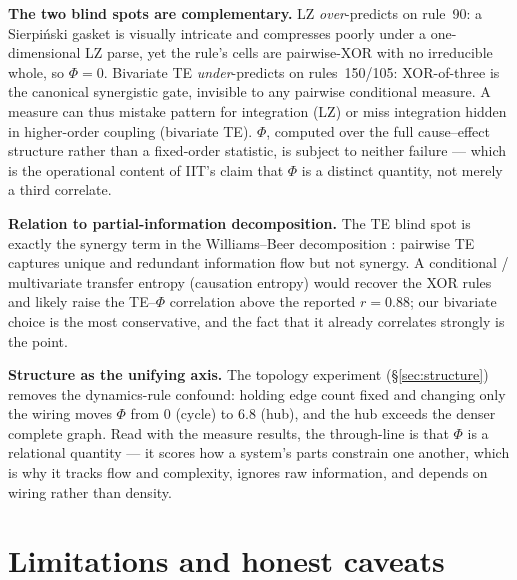 \documentclass[11pt,a4paper]{article}
\newcommand{\bigphi}{\ensuremath{\Phi}}
\begin{document}
\textbf{The two blind spots are complementary.} LZ \emph{over}-predicts on
rule~90: a Sierpi\'nski gasket is visually intricate and compresses
poorly under a one-dimensional LZ parse, yet the rule's cells are
pairwise-XOR with no irreducible whole, so \(\bigphi=0\). Bivariate TE
\emph{under}-predicts on rules~150/105: XOR-of-three is the canonical
synergistic gate, invisible to any pairwise conditional measure. A measure
can thus mistake pattern for integration (LZ) or miss integration hidden
in higher-order coupling (bivariate TE). \bigphi{}, computed over the full
cause--effect structure rather than a fixed-order statistic, is subject to
neither failure --- which is the operational content of IIT's claim that
\bigphi{} is a distinct quantity, not merely a third correlate.

\textbf{Relation to partial-information decomposition.} The TE blind spot
is exactly the synergy term in the Williams--Beer decomposition
\citep{williamsbeer2010}: pairwise TE captures unique and redundant
information flow but not synergy. A conditional / multivariate transfer
entropy (causation entropy) would recover the XOR rules and likely raise
the TE--\bigphi{} correlation above the reported \(r=0.88\); our bivariate
choice is the most conservative, and the fact that it already correlates
strongly is the point.

\textbf{Structure as the unifying axis.} The topology experiment
(\S\ref{sec:structure}) removes the dynamics-rule confound: holding edge
count fixed and changing only the wiring moves \bigphi{} from \(0\)
(cycle) to \(6.8\) (hub), and the hub exceeds the denser complete graph.
Read with the measure results, the through-line is that \bigphi{} is a
relational quantity --- it scores how a system's parts constrain one
another, which is why it tracks flow and complexity, ignores raw
information, and depends on wiring rather than density.

\section{Limitations and honest caveats}
\label{sec:limits}
\end{document}
